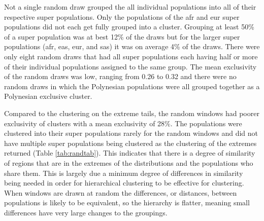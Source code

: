 \documentclass[twoside,openright]{report}
\begin{document}
Not a single random draw grouped the all individual populations into all
of their respective super populations. Only the populations of the
\gls{afr} and \gls{eur} super populations did not each get fully grouped
into a cluster. Grouping at least 50\% of a super population was at best
12\% of the draws but for the larger super populations (\gls{afr},
\gls{eas}, \gls{eur}, and \gls{sas}) it was on average 4\% of the draws.
There were only eight random draws that had all super populations each
having half or more of their individual populations assigned to the same
group. The mean exclusivity of the random draws was low, ranging from
0.26 to 0.32 and there were no random draws in which the Polynesian
populations were all grouped together as a Polynesian exclusive cluster.

Compared to the clustering on the extreme tails, the random windows had
poorer exclusivity of clusters with a mean exclusivity of 28\%. The
populations were clustered into their super populations rarely for the
random windows and did not have multiple super populations being
clustered as the clustering of the extremes returned (Table
\ref{tab:randtab}). This indicates that there is a degree of similarity
of regions that are in the extremes of the distributions and the
populations who share them. This is largely due a minimum degree of
differences in similarity being needed in order for hierarchical
clustering to be effective for clustering. When windows are drawn at
random the differences, or distances, between populations is likely to
be equivalent, so the hierarchy is flatter, meaning small differences
have very large changes to the groupings.
\end{document}
